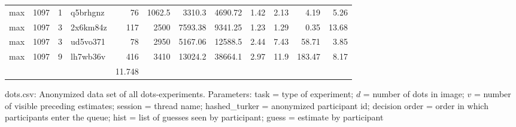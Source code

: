 \documentclass[9pt,a4paper,twocolumn,lineno]{article}
\begin{document}
\begin{table}
\begin{tabular}{lrrlrrrrrrrr}
 max      & 1097 &   1 & q5brhgnz &  76 &   1062.5 &  3310.3  &  4690.72 &  1.42 &   2.13 &   4.19 &         5.26 \\
 max      & 1097 &   3 & 2x6km84z & 117 &   2500   &  7593.38 &  9341.25 &  1.23 &   1.29 &   0.35 &        13.68 \\
 max      & 1097 &   3 & ud5vo371 &  78 &   2950   &  5167.06 & 12588.5  &  2.44 &   7.43 &  58.71 &         3.85 \\
 max      & 1097 &   9 & lh7wb36v & 416 &   3410   & 13024.2  & 38664.1  &  2.97 &  11.9  & 183.47 &         8.17 \\
\hline
 &&&& 11.748 &&&&&&& 
\\
\end{tabular}
\end{table}\label{table:S1}

dots.csv: Anonymized data set of all dots-experiments. Parameters: task = type of experiment; $d$ = number of dots in image; $v$ = number of visible preceding estimates; session = thread name; hashed\_turker = anonymized participant id; decision order = order in which participants enter the queue; hist = list of guesses seen by participant; guess = estimate by participant
 



\end{document}
